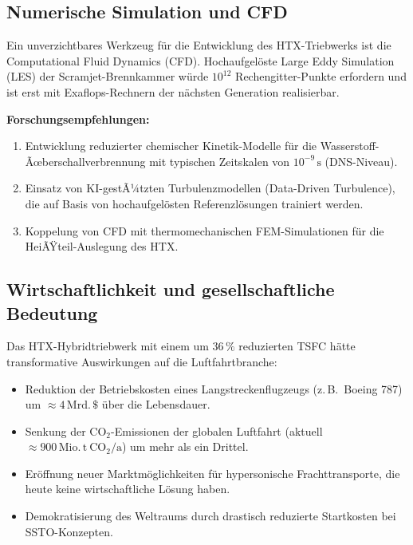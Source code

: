 ﻿\documentclass[12pt,a4paper]{article}
\theoremstyle{remark}
\begin{document}
\subsection{Numerische Simulation und CFD}

Ein unverzichtbares Werkzeug f\"ur die Entwicklung des HTX-Triebwerks
ist die Computational Fluid Dynamics (CFD).
Hochaufgel\"oste Large Eddy Simulation (LES) der Scramjet-Brennkammer
w\"urde $10^{12}$ Rechengitter-Punkte erfordern und ist erst mit
Exaflops-Rechnern der n\"achsten Generation realisierbar.

\textbf{Forschungsempfehlungen:}
\begin{enumerate}[label=(\arabic*)]
  \item Entwicklung reduzierter chemischer Kinetik-Modelle f\"ur die
        Wasserstoff-Ãœber\-schallverbrennung mit typischen Zeitskalen
        von $10^{-9}\,\mathrm{s}$ (DNS-Niveau).
  \item Einsatz von KI-gestÃ¼tzten Turbulenzmodellen (Data-Driven Turbulence),
        die auf Basis von hochaufgel\"osten Referenzl\"osungen trainiert werden.
  \item Koppelung von CFD mit thermomechanischen FEM-Simulationen
        f\"ur die HeiÃŸteil-Auslegung des HTX.
\end{enumerate}

\subsection{Wirtschaftlichkeit und gesellschaftliche Bedeutung}

Das HTX-Hybridtriebwerk mit einem um $36\,\%$ reduzierten TSFC
h\"atte transformative Auswirkungen auf die Luftfahrtbranche:
\begin{itemize}
  \item Reduktion der Betriebskosten eines Langstreckenflugzeugs
        (z.\,B.\ Boeing 787) um $\approx 4\,\mathrm{Mrd.\,\$}$ \"uber die Lebensdauer.
  \item Senkung der CO$_2$-Emissionen der globalen Luftfahrt
        (aktuell $\approx 900\,\mathrm{Mio.\,t\ CO_2/a}$) um mehr als ein Drittel.
  \item Er\"offnung neuer Marktm\"oglichkeiten f\"ur hypersonische Frachttransporte,
        die heute keine wirtschaftliche L\"osung haben.
  \item Demokratisierung des Weltraums durch drastisch reduzierte
        Startkosten bei SSTO-Konzepten.
\end{itemize}
\end{document}
